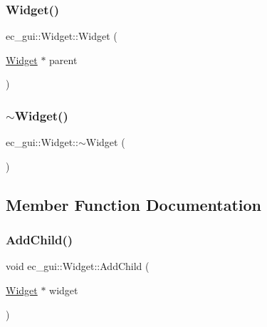\subsubsection{\texorpdfstring{Widget()}{Widget()}}
{\footnotesize\ttfamily ec\+\_\+gui\+::\+Widget\+::\+Widget (\begin{DoxyParamCaption}\item[{\mbox{\hyperlink{classec__gui_1_1_widget}{Widget}} $\ast$}]{parent }\end{DoxyParamCaption})\hspace{0.3cm}{\ttfamily [explicit]}}

\mbox{\label{classec__gui_1_1_widget_a4e74d028fcbbb8b939f5017d3052578e}} 
\subsubsection{\texorpdfstring{$\sim$\+Widget()}{~Widget()}}
{\footnotesize\ttfamily ec\+\_\+gui\+::\+Widget\+::$\sim$\+Widget (\begin{DoxyParamCaption}{ }\end{DoxyParamCaption})\hspace{0.3cm}{\ttfamily [virtual]}}



\subsection{Member Function Documentation}
\mbox{\label{classec__gui_1_1_widget_ac6e916b4ca37bff9ef9167eab55062f6}} 
\subsubsection{\texorpdfstring{Add\+Child()}{AddChild()}}
{\footnotesize\ttfamily void ec\+\_\+gui\+::\+Widget\+::\+Add\+Child (\begin{DoxyParamCaption}\item[{\mbox{\hyperlink{classec__gui_1_1_widget}{Widget}} $\ast$}]{widget }\end{DoxyParamCaption})\hspace{0.3cm}{\ttfamily [virtual]}}



